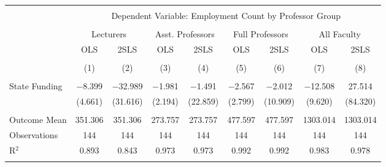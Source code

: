 
\begin{tabular}{@{\extracolsep{5pt}}lcccccccc} 
\\[-1.8ex]\hline 
\hline \\[-1.8ex] 
 & \multicolumn{8}{c}{Dependent Variable: Employment Count by Professor Group} \\ 
\cline{2-9} 
\\[-1.8ex] & \multicolumn{2}{c}{Lecturers} & \multicolumn{2}{c}{Asst. Professors} & \multicolumn{2}{c}{Full Professors} & \multicolumn{2}{c}{All Faculty} \\ 
 & OLS & 2SLS & OLS & 2SLS & OLS & 2SLS & OLS & 2SLS \\ 
\\[-1.8ex] & (1) & (2) & (3) & (4) & (5) & (6) & (7) & (8)\\ 
\hline \\[-1.8ex] 
 State Funding & $-$8.399 & $-$32.989 & $-$1.981 & $-$1.491 & $-$2.567 & $-$2.012 & $-$12.508 & 27.514 \\ 
  & (4.661) & (31.616) & (2.194) & (22.859) & (2.799) & (10.909) & (9.620) & (84.320) \\ 
 \hline \\[-1.8ex] 
Outcome Mean & 351.306 & 351.306 & 273.757 & 273.757 & 477.597 & 477.597 & 1303.014 & 1303.014 \\ 
Observations & 144 & 144 & 144 & 144 & 144 & 144 & 144 & 144 \\ 
R$^{2}$ & 0.893 & 0.843 & 0.973 & 0.973 & 0.992 & 0.992 & 0.983 & 0.978 \\ 
\hline 
\hline \\[-1.8ex] 
\end{tabular} 
